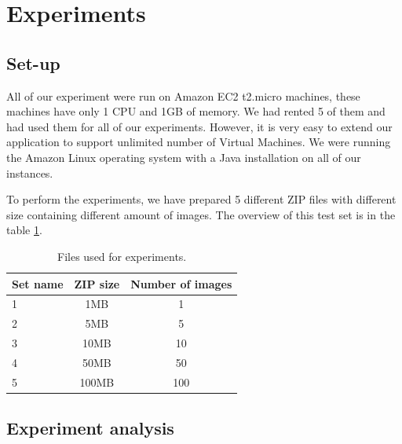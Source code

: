 \section{Experiments}
\label{exp}

\subsection{Set-up}
All of our experiment were run on Amazon EC2 t2.micro machines, these machines have only 1 CPU and 1GB of memory. We had rented 5 of them and had used them for all of our experiments. However, it is very easy to extend our application to support unlimited number of Virtual Machines. We were running the Amazon Linux operating system with a Java installation on all of our instances.

To perform the experiments, we have prepared 5 different ZIP files with different size containing different amount of images. The overview of this test set is in the table \ref{testset}.

\begin{table}
\centering
 \label{testset}
 \begin{tabular}{| l | c | c |}
  \hline
  Set name & ZIP size & Number of images \\
  \hline
  \hline
  1 & 1MB & 1\\
  2 & 5MB & 5\\
  3 & 10MB & 10\\
  4 & 50MB & 50\\
  5 & 100MB & 100\\
  \hline
 \end{tabular}

 \caption{Files used for experiments.}
\end{table}

\subsection{Experiment analysis}

